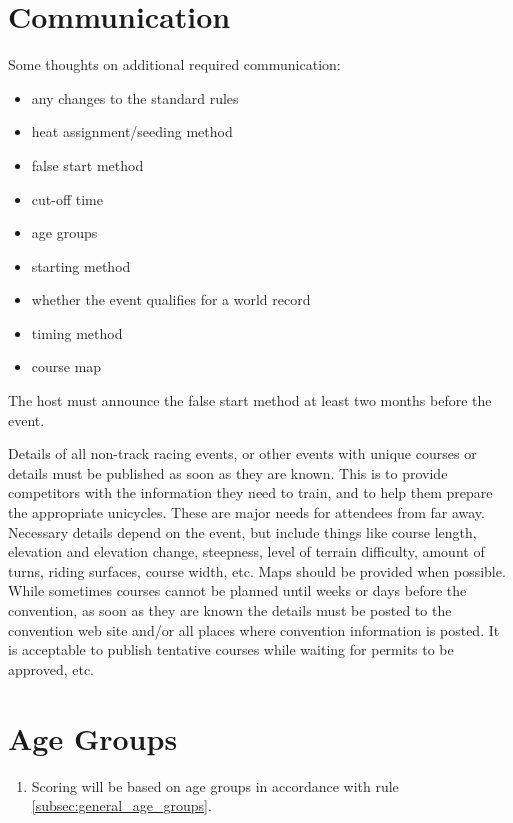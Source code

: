 \section{Communication}

\begin{comment2016}
Some thoughts on additional required communication:
\begin{itemize}
\item any changes to the standard rules
\item heat assignment/seeding method
\item false start method
\item cut-off time
\item age groups
\item starting method
\item whether the event qualifies for a world record
\item timing method
\item course map
\end{itemize}
\end{comment2016}

The host must announce the false start method at least two months before the event.

Details of all non-track racing events, or other events with unique courses or details must be published as soon as they are known.
This is to provide competitors with the information they need to train, and to help them prepare the appropriate unicycles.
These are major needs for attendees from far away.
Necessary details depend on the event, but include things like course length, elevation and elevation change, steepness, 
level of terrain difficulty, amount of turns, riding surfaces, course width, etc.
Maps should be provided when possible.
While sometimes courses cannot be planned until weeks or days before the convention, as soon as they are known the details 
must be posted to the convention web site and/or all places where convention information is posted.
It is acceptable to publish tentative courses while waiting for permits to be approved, etc.

\section{Age Groups}

\begin{enumerate}[leftmargin=1.5em,labelsep=*]
	\item Scoring will be based on age groups in accordance with rule \ref{subsec:general_age_groups}.
\end{enumerate}


